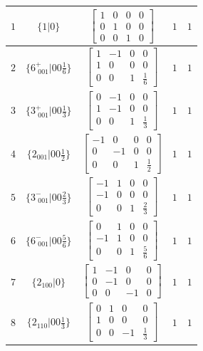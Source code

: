 \documentclass[fleqn,8pt]{jsarticle}
\begin{document}
\begin{longtable}{ccccc}
$ 1 $ & $ \{1|0\} $ & $ \begin{bmatrix} 1 & 0 & 0 & 0 \\ 0 & 1 & 0 & 0 \\ 0 & 0 & 1 & 0 \end{bmatrix} $ & $ 1 $ & $ 1 $ \\ \hline
$ 2 $ & $ \{6^{+}_{\,\,001}|0 0 \frac{1}{6}\} $ & $ \begin{bmatrix} 1 & -1 & 0 & 0 \\ 1 & 0 & 0 & 0 \\ 0 & 0 & 1 & \frac{1}{6} \end{bmatrix} $ & $ 1 $ & $ 1 $ \\ \hline
$ 3 $ & $ \{3^{+}_{\,\,001}|0 0 \frac{1}{3}\} $ & $ \begin{bmatrix} 0 & -1 & 0 & 0 \\ 1 & -1 & 0 & 0 \\ 0 & 0 & 1 & \frac{1}{3} \end{bmatrix} $ & $ 1 $ & $ 1 $ \\ \hline
$ 4 $ & $ \{2{}_{001}|0 0 \frac{1}{2}\} $ & $ \begin{bmatrix} -1 & 0 & 0 & 0 \\ 0 & -1 & 0 & 0 \\ 0 & 0 & 1 & \frac{1}{2} \end{bmatrix} $ & $ 1 $ & $ 1 $ \\ \hline
$ 5 $ & $ \{3^{-}_{\,\,001}|0 0 \frac{2}{3}\} $ & $ \begin{bmatrix} -1 & 1 & 0 & 0 \\ -1 & 0 & 0 & 0 \\ 0 & 0 & 1 & \frac{2}{3} \end{bmatrix} $ & $ 1 $ & $ 1 $ \\ \hline
$ 6 $ & $ \{6^{-}_{\,\,001}|0 0 \frac{5}{6}\} $ & $ \begin{bmatrix} 0 & 1 & 0 & 0 \\ -1 & 1 & 0 & 0 \\ 0 & 0 & 1 & \frac{5}{6} \end{bmatrix} $ & $ 1 $ & $ 1 $ \\ \hline
$ 7 $ & $ \{2{}_{100}|0\} $ & $ \begin{bmatrix} 1 & -1 & 0 & 0 \\ 0 & -1 & 0 & 0 \\ 0 & 0 & -1 & 0 \end{bmatrix} $ & $ 1 $ & $ 1 $ \\ \hline
$ 8 $ & $ \{2{}_{110}|0 0 \frac{1}{3}\} $ & $ \begin{bmatrix} 0 & 1 & 0 & 0 \\ 1 & 0 & 0 & 0 \\ 0 & 0 & -1 & \frac{1}{3} \end{bmatrix} $ & $ 1 $ & $ 1 $ \\ \hline

\end{longtable}
\end{document}
